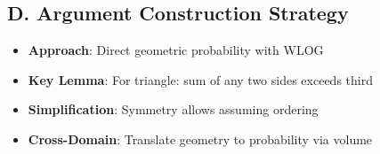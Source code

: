 \documentclass[11pt]{article}
\begin{document}
\begin{strategicbox}
\subsection*{D. Argument Construction Strategy}
\begin{itemize}[leftmargin=*]
    \item \textbf{Approach}: Direct geometric probability with WLOG
    \item \textbf{Key Lemma}: For triangle: sum of any two sides exceeds third
    \item \textbf{Simplification}: Symmetry allows assuming ordering
    \item \textbf{Cross-Domain}: Translate geometry to probability via volume
\end{itemize}
\end{strategicbox}
\end{document}
